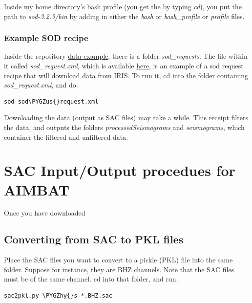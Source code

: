 \documentclass[letterpaper,10pt,english]{sphinxmanual}
\def\PYGZus{\char`\_}
\def\PYGZhy{\char`\-}
\begin{document}
Inside my home directory's bash profile (you get the by typing \emph{cd}), you put the path to \emph{sod-3.2.3/bin} by adding in either the \emph{bash} or \emph{bash\_profile} or \emph{profile} files.


\subsection{Example SOD recipe}
\label{docfiles/gettingData:example-sod-recipe}
Inside the repository \href{https://github.com/pysmo/data-example}{data-example}, there is a folder \emph{sod\_requests}. The file within it called \emph{sod\_request.xml}, which is available \href{https://github.com/pysmo/data-example/blob/master/sod\_requests/sod\_request.xml}{here}, is an example of a sod request recipe that will download data from IRIS. To run it, cd into the folder containing \emph{sod\_request.xml}, and do:

\begin{Verbatim}[commandchars=\\\{\}]
sod sod\PYGZus{}request.xml
\end{Verbatim}

Downloading the data (output as SAC files) may take a while. This receipt filters the data, and outputs the folders \emph{processedSeismograms} and \emph{seismograms}, which container the filtered and unfiltered data.


\chapter{SAC Input/Output procedues for AIMBAT}
\label{docfiles/sacioAIMBAT:sac-input-output-procedues-for-aimbat}\label{docfiles/sacioAIMBAT::doc}
Once you have downloaded


\section{Converting from SAC to PKL files}
\label{docfiles/sacioAIMBAT:converting-from-sac-to-pkl-files}
Place the SAC files you want to convert to a pickle (PKL) file into the same folder. Suppose for instance, they are BHZ channels. Note that the SAC files must be of the same channel. cd into that folder, and run:

\begin{Verbatim}[commandchars=\\\{\}]
sac2pkl.py \PYGZhy{}s *.BHZ.sac
\end{Verbatim}
\end{document}
